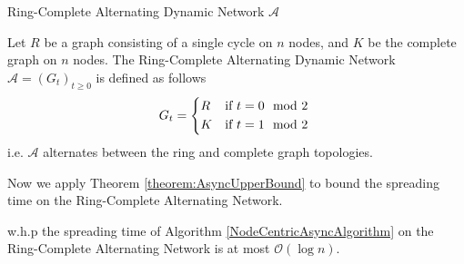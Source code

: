 \begin{definition}
	Ring-Complete Alternating Dynamic Network $\mathcal{A}$

	\noindent
	Let $R$ be a graph consisting of a single cycle on $n$ nodes, and $K$ be the complete graph on $n$ nodes. The Ring-Complete Alternating Dynamic Network $\mathcal{A} = (G_t)_{t \geq 0}$ is defined as follows 
	\begin{equation*}
		G_t = 
		\begin{cases*}
			R & if $t = 0 \mod 2$ \\
			K & if $t = 1 \mod 2$
		  \end{cases*}
	\end{equation*}
	i.e. $\mathcal{A}$ alternates between the ring and complete graph topologies.
\end{definition}

Now we apply Theorem \ref{theorem:AsyncUpperBound} to bound the spreading time on the Ring-Complete Alternating Network.

\begin{theorem}\label{theorem:ringCompleteAsyncBound}
	w.h.p the spreading time of Algorithm \ref{NodeCentricAsyncAlgorithm} on the Ring-Complete Alternating Network is at most $\mathcal{O}(\log n)$. 
\end{theorem}

